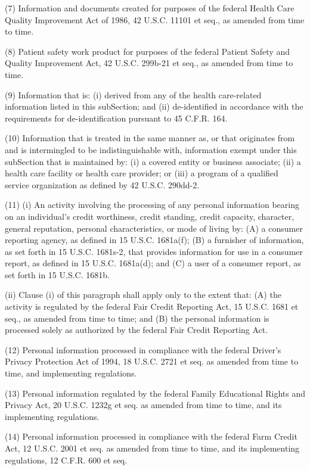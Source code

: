 (7) Information and documents created for purposes of the federal Health Care Quality Improvement Act of 1986, 42 U.S.C. 11101 et seq., as amended from time to time.

(8) Patient safety work product for purposes of the federal Patient Safety and Quality Improvement Act, 42 U.S.C. 299b-21 et seq., as amended from time to time.

(9) Information that is: (i) derived from any of the health care-related information listed in this subSection; and (ii) de-identified in accordance with the requirements for de-identification pursuant to 45 C.F.R. 164.

(10) Information that is treated in the same manner as, or that originates from and is intermingled to be indistinguishable with, information exempt under this subSection that is maintained by: (i) a covered entity or business associate; (ii) a health care facility or health care provider; or (iii) a program of a qualified service organization as defined by 42 U.S.C. 290dd-2.  

(11) (i) An activity involving the processing of any personal information bearing on an individual’s credit worthiness, credit standing, credit capacity, character, general reputation, personal characteristics, or mode of living by: (A) a consumer reporting agency, as defined in 15 U.S.C. 1681a(f); (B) a furnisher of information, as set forth in 15 U.S.C. 1681s-2, that provides information for use in a consumer report, as defined in 15 U.S.C. 1681a(d); and (C) a user of a consumer report, as set forth in 15 U.S.C. 1681b.

(ii) Clause (i) of this paragraph shall apply only to the extent that: (A) the activity is regulated by the federal Fair Credit Reporting Act, 15 U.S.C. 1681 et seq., as amended from time to time; and (B) the personal information is processed solely as authorized by the federal Fair Credit Reporting Act.

(12) Personal information processed in compliance with the federal Driver’s Privacy Protection Act of 1994, 18 U.S.C. 2721 et seq. as amended from time to time, and implementing regulations.

(13) Personal information regulated by the federal Family Educational Rights and Privacy Act, 20 U.S.C. 1232g et seq. as amended from time to time, and its implementing regulations.

(14) Personal information processed in compliance with the federal Farm Credit Act, 12 U.S.C. 2001 et seq. as amended from time to time, and its implementing regulations, 12 C.F.R. 600 et seq.

